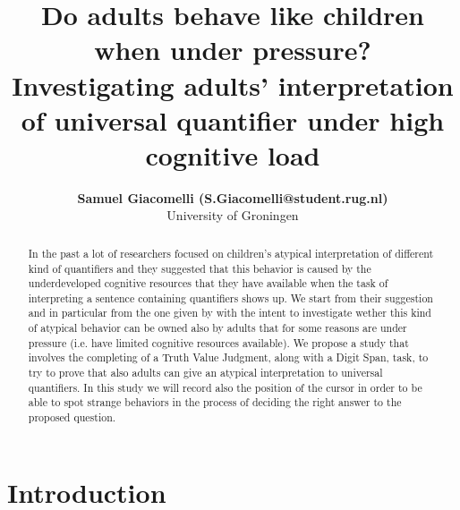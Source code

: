 \documentclass[10pt, a4]{article}
\title{Do adults behave like children when under pressure?\\
\large Investigating adults' interpretation of universal quantifier under high cognitive load}
\author{{\large \bf Samuel Giacomelli (S.Giacomelli@student.rug.nl)} \\
University of Groningen}
\begin{document}
\maketitle

\begin{abstract}
    In the past a lot of researchers focused on children's atypical interpretation of different kind of quantifiers
    and they suggested that this behavior is caused by the underdeveloped cognitive resources that they have available
    when the task of interpreting a sentence containing quantifiers shows up. We start from their suggestion and in
    particular from the one given by \cite{minai2012hinders} with the intent to investigate wether this kind of atypical
    behavior can be owned also by adults that for some reasons are under pressure (i.e. have limited cognitive resources
    available). We propose a study that involves the completing of a Truth Value Judgment, along with a Digit Span, task,
    to try to prove that also adults can give an atypical interpretation to universal quantifiers. In this study we will
    record also the position of the cursor in order to be able to spot strange behaviors in the process of deciding the
    right answer to the proposed question.
\end{abstract}

\section{Introduction}
\end{document}

